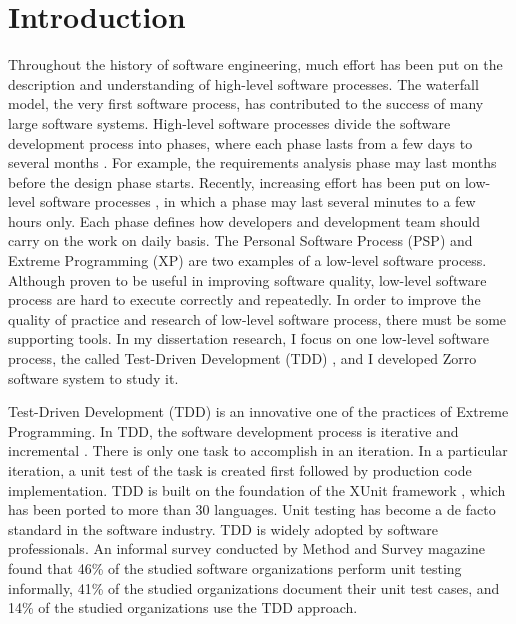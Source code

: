\chapter{Introduction}
\label{chap:intro} 
Throughout the history of software engineering, much effort has
been put on the description and understanding of high-level software 
processes. The waterfall model, the very 
first software process, has contributed to the success of many 
large software systems. High-level software processes divide the  
software development process into phases, where each phase lasts from a 
few days to several months \cite{Pfleeger:01,Pressman:03}. For example, the 
requirements analysis phase may last months before the design phase starts. 
Recently, increasing effort has been put on low-level software processes \cite{Larman:03,AgileAlliance}, in which a phase may last several minutes to 
a few hours only. Each phase defines how developers and development team 
should carry on the work on daily basis. The Personal Software Process 
(PSP) \cite{Humphrey:99} and Extreme Programming 
(XP) \cite{Jeffries:00,Beck:00,XP96} are two examples of a low-level 
software process. Although proven to be useful in improving software quality\cite{Ferguson:97,Kamatar:00,MicrosoftTSP,Janzen:05}, low-level 
software process are hard to execute correctly and repeatedly. In 
order to improve the quality of practice and research of low-level 
software process, there must be some supporting tools. In my 
dissertation research, I focus on one low-level software process, 
the called Test-Driven Development (TDD) \cite{Beck:03}, and I developed Zorro 
software system to study it.

Test-Driven Development (TDD) is an innovative one of the practices of Extreme
Programming. In TDD, the software development process is iterative and
incremental \cite{Larman:03}. There is only one task to accomplish in an
iteration. In a particular iteration, a unit test of the task is created
first followed by production code implementation.  TDD is built on the
foundation of the XUnit framework \cite{XUnit}, which has been ported to
more than 30 languages. Unit testing has become a de facto standard in the
software industry. TDD is widely adopted by software professionals. An
informal survey \cite{UnitTestingPoll:06} conducted by Method and Survey
magazine found that 46\% of the studied software organizations perform unit
testing informally, 41\% of the studied organizations document their unit
test cases, and 14\% of the studied organizations use the TDD approach.

